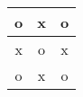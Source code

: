 \documentclass{article}
\begin{document}
\vspace*{\fill} \vspace*{-5ex}

\begin{tabular}{||c|cc|}
\hline
o & x & o\\\hline
x & o & x\\
o & x & o\\\hline
\end{tabular}

\vspace*{\fill}
\end{document}
